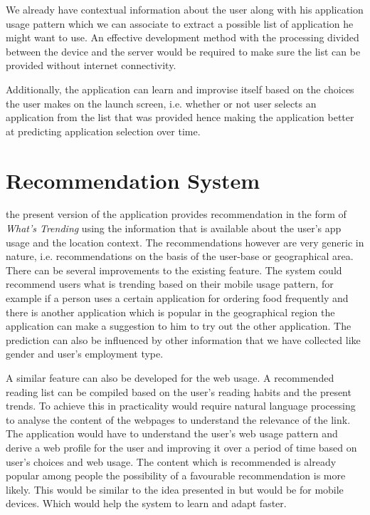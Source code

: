 \documentclass[12pt]{report}
\begin{document}
We already have contextual information about the user along with his application usage pattern which we can associate to extract a possible list of application he might want to use. An effective development method with the processing divided between the device and the server would be required to make sure the list can be provided without internet connectivity.

Additionally, the application can learn and improvise itself based on the choices the user makes on the launch screen, i.e. whether or not user selects an application from the list that was provided hence making the application better at predicting application selection over time.

\section{Recommendation System}
\label{RecommendationSystem}

the present version of the application provides recommendation in the form of \textit{What's Trending} using the information that is available about the user's app usage and the location context. The recommendations however are very generic in nature, i.e. recommendations on the basis of the user-base or geographical area. There can be several improvements to the existing feature. The system could recommend users what is trending based on their mobile usage pattern, for example if a person uses a certain application for ordering food frequently and there is another application which is popular in the geographical region the application can make a suggestion to him to try out the other application. The prediction can also be influenced by other information that we have collected like gender and user's employment type.

A similar feature can also be developed for the web usage. A recommended reading list can be compiled based on the user's reading habits and the present trends. To achieve this in practicality would require natural language processing to analyse the content of the webpages to understand the relevance of the link. The application would have to understand the user's web usage pattern and derive a web profile for the user and improving it over a period of time based on user's choices and web usage. The content which is recommended is already popular among people the possibility of a favourable recommendation is more likely. This would be similar to the idea presented in \cite{BalabanovicAWP1997} but would be for mobile devices. Which would help the system to learn and adapt faster.
\end{document}

